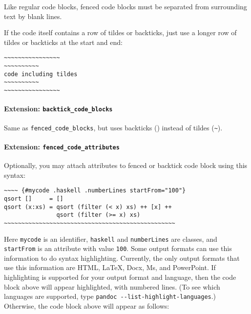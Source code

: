\documentclass[
]{article}
\begin{document}
Like regular code blocks, fenced code blocks must be separated from
surrounding text by blank lines.

If the code itself contains a row of tildes or backticks, just use a
longer row of tildes or backticks at the start and end:

\begin{verbatim}
~~~~~~~~~~~~~~~~
~~~~~~~~~~
code including tildes
~~~~~~~~~~
~~~~~~~~~~~~~~~~
\end{verbatim}

\hypertarget{extension-backtick_code_blocks}{%
\paragraph{\texorpdfstring{Extension:
\texttt{backtick\_code\_blocks}}{Extension: backtick\_code\_blocks}}\label{extension-backtick_code_blocks}}

Same as \texttt{fenced\_code\_blocks}, but uses backticks
(\texttt{\textasciigrave{}}) instead of tildes
(\texttt{\textasciitilde{}}).

\hypertarget{extension-fenced_code_attributes}{%
\paragraph{\texorpdfstring{Extension:
\texttt{fenced\_code\_attributes}}{Extension: fenced\_code\_attributes}}\label{extension-fenced_code_attributes}}

Optionally, you may attach attributes to fenced or backtick code block
using this syntax:

\begin{verbatim}
~~~~ {#mycode .haskell .numberLines startFrom="100"}
qsort []     = []
qsort (x:xs) = qsort (filter (< x) xs) ++ [x] ++
               qsort (filter (>= x) xs)
~~~~~~~~~~~~~~~~~~~~~~~~~~~~~~~~~~~~~~~~~~~~~~~~~
\end{verbatim}

Here \texttt{mycode} is an identifier, \texttt{haskell} and
\texttt{numberLines} are classes, and \texttt{startFrom} is an attribute
with value \texttt{100}. Some output formats can use this information to
do syntax highlighting. Currently, the only output formats that use this
information are HTML, LaTeX, Docx, Ms, and PowerPoint. If highlighting
is supported for your output format and language, then the code block
above will appear highlighted, with numbered lines. (To see which
languages are supported, type
\texttt{pandoc\ -\/-list-highlight-languages}.) Otherwise, the code
block above will appear as follows:
\end{document}
